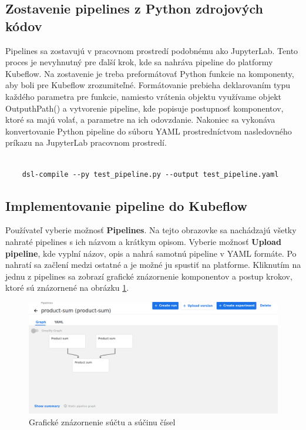 \subsection*{Zostavenie pipelines z Python zdrojových kódov}

Pipelines sa zostavujú v pracovnom prostredí podobnému ako JupyterLab. Tento proces je nevyhnutný pre ďalší krok, kde sa nahráva pipeline do platformy Kubeflow. Na zostavenie je treba preformátovať Python funkcie na komponenty, aby boli pre Kubeflow zrozumiteľné. Formátovanie prebieha deklarovaním typu každého parametra pre funkcie, namiesto vrátenia objektu využívame objekt OutputhPath() a vytvorenie pipeline, kde popisuje postupnosť komponentov, ktoré sa majú volať, a parametre na ich odovzdanie. Nakoniec sa vykonáva konvertovanie Python pipeline do súboru YAML prostredníctvom nasledovného príkazu na JupyterLab pracovnom prostredí.

\begin{lstlisting}[basicstyle=\footnotesize]

    dsl-compile --py test_pipeline.py --output test_pipeline.yaml
    \end{lstlisting}

\subsection*{Implementovanie pipeline do Kubeflow}

Používateľ vyberie možnosť \textbf{Pipelines}. Na tejto obrazovke sa nachádzajú všetky nahraté pipelines s ich názvom a krátkym opisom. Vyberie možnosť \textbf{Upload pipeline}, kde vyplní názov, opis a nahrá samotnú pipeline v YAML formáte. Po nahratí sa začlení medzi ostatné a je možné ju spustiť na platforme. Kliknutím na jednu z pipelines sa zobrazí grafické znázornenie komponentov a postup krokov, ktoré sú znázornené na obrázku \ref{pipa}.

\begin{figure}[!h]
    \centering
    \includegraphics[width=1\linewidth]{figures/7.png}
    \caption{Grafické znázornenie súčtu a súčinu čísel}
    \label{pipa}
\end{figure}

